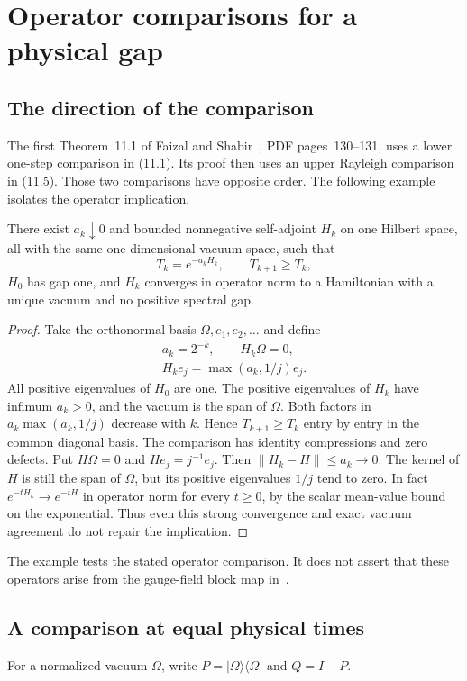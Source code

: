 \section{Operator comparisons for a physical gap}\label{round26:app:operators}
\subsection{The direction of the comparison}
The first Theorem~11.1 of Faizal and Shabir~\cite{FaS26}, PDF
pages~130--131, uses a lower one-step comparison in (11.1).
Its proof then uses an upper Rayleigh comparison in (11.5).
Those two comparisons have opposite order. The following
example isolates the operator implication.

\begin{proposition}
There exist $a_k\downarrow0$ and bounded nonnegative
self-adjoint $H_k$ on one Hilbert space, all with the same
one-dimensional vacuum space, such that
\[
 T_k=e^{-a_kH_k},\qquad T_{k+1}\ge T_k,
\]
$H_0$ has gap one, and $H_k$ converges in operator norm to a
Hamiltonian with a unique vacuum and no positive spectral gap.
\end{proposition}
\begin{proof}
Take the orthonormal basis $\Omega,e_1,e_2,\ldots$ and define
\begin{gather*}
 a_k=2^{-k},\qquad H_k\Omega=0,\\
 H_ke_j=\max(a_k,1/j)e_j.
\end{gather*}
All positive eigenvalues of $H_0$ are one. The positive
eigenvalues of $H_k$ have infimum $a_k>0$, and the vacuum
is the span of $\Omega$. Both factors in
$a_k\max(a_k,1/j)$ decrease with $k$. Hence $T_{k+1}\ge T_k$
entry by entry in the common diagonal basis. The comparison
has identity compressions and zero defects.
Put $H\Omega=0$ and $He_j=j^{-1}e_j$. Then
$\|H_k-H\|\le a_k\to0$. The kernel of $H$ is still the
span of $\Omega$, but its positive eigenvalues $1/j$ tend
to zero. In fact $e^{-tH_k}\to e^{-tH}$ in operator norm
for every $t\ge0$, by the scalar mean-value bound on the
exponential. Thus even this strong convergence and exact
vacuum agreement do not repair the implication.
\end{proof}

The example tests the stated operator comparison. It does
not assert that these operators arise from the gauge-field
block map in~\cite{FaS26}.

\subsection{A comparison at equal physical times}
For a normalized vacuum $\Omega$, write
$P=|\Omega\rangle\langle\Omega|$ and $Q=I-P$.

